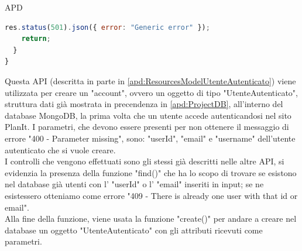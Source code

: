 \begin{listaPersonale} {APD}
\begin{listaPersonale2}[APD]{}
\begin{lstlisting}[language=JavaScript]
    res.status(501).json({ error: "Generic error" });
    return;
  }
}
                \end{lstlisting}
                Questa API (descritta in parte in \ref{apd:ResourcesModelUtenteAutenticato}) viene utilizzata per creare un "account", ovvero un oggetto di tipo "UtenteAutenticato", struttura dati già mostrata in precendenza in \ref{apd:ProjectDB}, all'interno del database MongoDB, la prima volta che un utente accede autenticandosi nel sito PlanIt. I parametri, che devono essere presenti per non ottenere il messaggio di errore "400 - Parameter missing", sono: "userId", "email" e "username" dell'utente autenticato che si vuole creare. \\
                I controlli che vengono effettuati sono gli stessi già descritti nelle altre API, si evidenzia la presenza della funzione "find()" che ha lo scopo di trovare se esistono nel database già utenti con l' "userId" o l' "email" inseriti in input; se ne esistessero otteniamo come errore "409 - There is already one user with that id or email". \\
                Alla fine della funzione, viene usata la funzione "create()" per andare a creare nel database un oggetto "UtenteAutenticato" con gli attributi ricevuti come parametri.

\end{listaPersonale2}
\end{listaPersonale}
